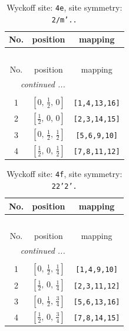 \documentclass[fleqn,8pt]{jsarticle}
\begin{document}
\begin{longtable}{ccc}
\caption{Wyckoff site: {\tt 4e}, site symmetry: {\tt 2/m'..}}
 \\
 \hline \hline
No. & position & mapping \\ \hline \endfirsthead

\multicolumn{2}{l}{\tablename\ \thetable{}} \\
 \hline \hline
No. & position & mapping \\ \hline \endhead

 \hline \hline
\multicolumn{2}{r}{\footnotesize\it continued ...} \\ \endfoot

 \hline \hline
\multicolumn{2}{r}{} \\ \endlastfoot

1 & $\left[ 0,\, \frac{1}{2},\, 0 \right]$ & {\tt [1,4,13,16]} \\ \hline
2 & $\left[ \frac{1}{2},\, 0,\, 0 \right]$ & {\tt [2,3,14,15]} \\ \hline
3 & $\left[ 0,\, \frac{1}{2},\, \frac{1}{2} \right]$ & {\tt [5,6,9,10]} \\ \hline
4 & $\left[ \frac{1}{2},\, 0,\, \frac{1}{2} \right]$ & {\tt [7,8,11,12]} \\
\end{longtable}
\renewcommand{\arraystretch}{1.2}
\begin{longtable}{ccc}
\caption{Wyckoff site: {\tt 4f}, site symmetry: {\tt 22'2'.}}
 \\
 \hline \hline
No. & position & mapping \\ \hline \endfirsthead

\multicolumn{2}{l}{\tablename\ \thetable{}} \\
 \hline \hline
No. & position & mapping \\ \hline \endhead

 \hline \hline
\multicolumn{2}{r}{\footnotesize\it continued ...} \\ \endfoot

 \hline \hline
\multicolumn{2}{r}{} \\ \endlastfoot

1 & $\left[ 0,\, \frac{1}{2},\, \frac{1}{4} \right]$ & {\tt [1,4,9,10]} \\ \hline
2 & $\left[ \frac{1}{2},\, 0,\, \frac{1}{4} \right]$ & {\tt [2,3,11,12]} \\ \hline
3 & $\left[ 0,\, \frac{1}{2},\, \frac{3}{4} \right]$ & {\tt [5,6,13,16]} \\ \hline
4 & $\left[ \frac{1}{2},\, 0,\, \frac{3}{4} \right]$ & {\tt [7,8,14,15]} \\
\end{longtable}
\end{document}
